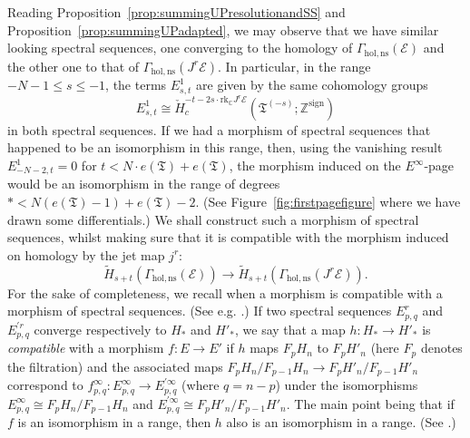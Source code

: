 \documentclass[a4paper]{amsart}
\newcommand{\bZ}{\mathbb Z}
\newcommand{\bC}{\mathbb C}
\newcommand{\cE}{\mathcal E}
\newcommand{\fT}{\mathfrak T}
\newcommand{\lra}{\longrightarrow}
\theoremstyle{plain}
\theoremstyle{definition}
\newcommand{\CCH}{\check{H}_{c}}
\newcommand{\rank}{\mathrm{rk}}
\begin{document}
Reading Proposition~\ref{prop:summingUPresolutionandSS} and Proposition~\ref{prop:summingUPadapted}, we may observe that we have similar looking spectral sequences, one converging to the homology of $\Gamma_{\mathrm{hol,ns}}(\cE)$ and the other one to that of $\Gamma_{\mathrm{hol,ns}}(J^r\cE)$. In particular, in the range $-N-1 \leq s \leq -1$, the terms $E^1_{s,t}$ are given by the same cohomology groups 
\[
    E^1_{s,t} \cong \CCH^{-t - 2s \cdot \rank_\bC J^r\cE}(\fT^{(-s)}; \bZ^\mathrm{sign})
    \]
in both spectral sequences. If we had a morphism of spectral sequences that happened to be an isomorphism in this range, then, using the vanishing result $E^1_{-N-2,t} = 0$ for $t < N\cdot e(\fT) + e(\fT)$, the morphism induced on the $E^\infty$-page would be an isomorphism in the range of degrees $* < N(e(\fT)-1) + e(\fT) - 2$. (See Figure~\ref{fig:firstpagefigure} where we have drawn some differentials.) We shall construct such a morphism of spectral sequences, whilst making sure that it is compatible with the morphism induced on homology by the jet map $j^r$:
\[
    \widetilde{H}_{s+t}(\Gamma_{\mathrm{hol,ns}}(\cE)) \lra \widetilde{H}_{s+t}(\Gamma_{\mathrm{hol,ns}}(J^r\cE)).
\]
For the sake of completeness, we recall when a morphism is compatible with a morphism of spectral sequences. (See e.g. \cite[Section 5.2]{weibel_introduction_1994}.) If two spectral sequences $E^r_{p,q}$ and $E^{'r}_{p,q}$ converge respectively to $H_*$ and $H'_*$, we say that a map $h \colon H_* \to H'_*$ is \emph{compatible} with a morphism $f \colon E \to E'$ if $h$ maps $F_p H_n$ to $F_p H'_n$ (here $F_p$ denotes the filtration) and the associated maps $F_p H_n / F_{p-1} H_n \to F_p H'_n / F_{p-1} H'_n$ correspond to $f^\infty_{p,q} \colon E^\infty_{p,q} \to E^{'\infty}_{p,q}$ (where $q = n-p$) under the isomorphisms $E^\infty_{p,q}\cong F_p H_n / F_{p-1} H_n$ and $E^{'\infty}_{p,q} \cong F_p H'_n / F_{p-1} H'_n$. The main point being that if $f$ is an isomorphism in a range, then $h$ also is an isomorphism in a range. (See \cite[Comparison Theorem 5.2.12]{weibel_introduction_1994}.)

\bigskip
\end{document}

